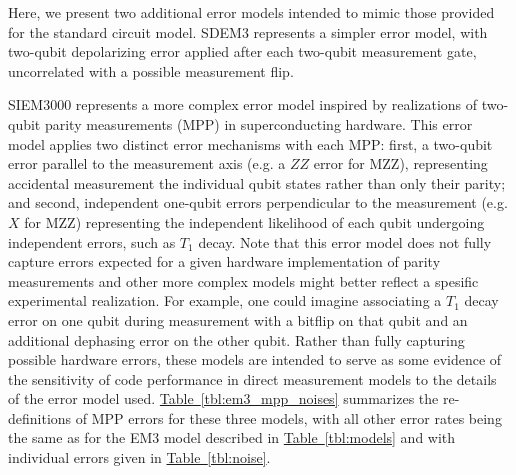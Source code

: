\documentclass[onecolumn,unpublished,a4paper]{quantumarticle}
\theoremstyle{definition}
\theoremstyle{definition}
\theoremstyle{definition}
\newcommand{\tbl}[1]{\hyperref[tbl:#1]{Table~\ref*{tbl:#1}}}
\begin{document}
Here, we present two additional error models intended to mimic those provided for the standard circuit model. 
SDEM3 represents a simpler error model, with two-qubit depolarizing error applied after each two-qubit measurement gate, uncorrelated with a possible measurement flip.

SIEM3000 represents a more complex error model inspired by realizations of two-qubit parity measurements (MPP) in superconducting hardware. This error model applies two distinct error mechanisms with each MPP: first, a two-qubit error parallel to the measurement axis (e.g. a $ZZ$ error for MZZ), representing accidental measurement the individual qubit states rather than only their parity; and second, independent one-qubit errors perpendicular to the measurement (e.g. $X$ for MZZ) representing the independent likelihood of each qubit undergoing independent errors, such as $T_1$ decay. Note that this error model does not fully capture errors expected for a given hardware implementation of parity measurements and other more complex models might better reflect a spesific experimental realization. For example, one could imagine associating a $T_1$ decay error on one qubit during measurement with a bitflip on that qubit and an additional dephasing error on the other qubit. Rather than fully capturing possible hardware errors, these models are intended to serve as some evidence of the sensitivity of code performance in direct measurement models to the details of the error model used. \tbl{em3_mpp_noises} summarizes the re-definitions of MPP errors for these three models, with all other error rates being the same as for the EM3 model described in \tbl{models} and with individual errors given in \tbl{noise}. 
\end{document}
